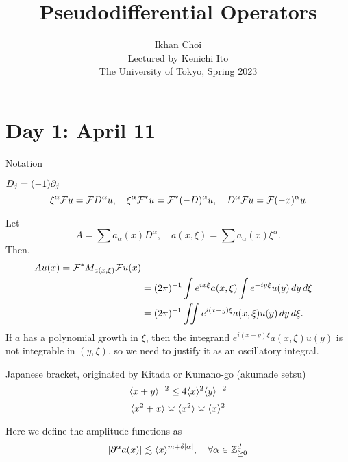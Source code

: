 \documentclass{../../small}
\begin{document}
\title{Pseudodifferential Operators}
\author{Ikhan Choi\\Lectured by Kenichi Ito\\The University of Tokyo, Spring 2023}
\maketitle
\tableofcontents

\newpage
\section{Day 1: April 11}


Notation

$D_j=(-1)\pd_j$
\[\xi^\alpha\mathcal{F} u=\mathcal{F} D^\alpha u,\quad\xi^\alpha\mathcal{F}^* u=\mathcal{F}^*(-D)^\alpha u,\quad D^\alpha\mathcal{F} u=\mathcal{F}(-x)^\alpha u\]

Let
\[A=\sum a_\alpha(x)D^\alpha,\quad a(x,\xi)=\sum a_\alpha(x)\xi^\alpha.\]
Then,
\begin{align*}
Au(x)=\mathcal{F}^*M_{a(x,\xi)}\mathcal{F} u(x)\\
&=(2\pi)^{-1}\int e^{ix\xi}a(x,\xi)\int e^{-iy\xi}u(y)\,dy\,d\xi\\
&=(2\pi)^{-1}\iint e^{i(x-y)\xi}a(x,\xi)u(y)\,dy\,d\xi.
\end{align*}
If $a$ has a polynomial growth in $\xi$, then the integrand $e^{i(x-y)\xi}a(x,\xi)u(y)$ is not integrable in $(y,\xi)$, so we need to justify it as an oscillatory integral.

\bigskip


Japanese bracket, originated by Kitada or Kumano-go (akumade setsu)
\[\langle x+y\rangle^{-2}\le4\langle x\rangle^2\langle y\rangle^{-2}\]
\[\langle x^2+x\rangle\asymp\langle x^2\rangle\asymp\langle x\rangle^2\]

\bigskip

Here we define the amplitude functions as
\[|\pd^\alpha a(x)|\lesssim\<x\>^{m+\delta|\alpha|},\quad\forall\alpha\in\Z_{\ge0}^d\]
\end{document}
